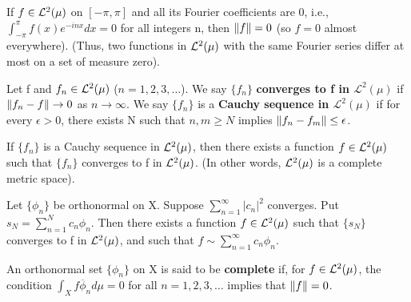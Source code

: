 \begin{corollary}
  \label{cor:chap11:fourier_uniqueness_L2}
  If $f \in \mathcal{L}^{2}(\mu)$ on $[-\pi, \pi]$ and all its Fourier
  coefficients are 0, i.e., $\int_{-\pi}^\pi f(x) e^{-inx} dx = 0$
  for all integers n, then $\left\lVert f \right\rVert = 0$ (so $f=0$ almost everywhere).
  (Thus, two functions in $\mathcal{L}^{2}(\mu)$ with the same Fourier series
  differ at most on a set of measure zero).
\end{corollary}

\begin{definition}
  \label{def:chap11:convergence_cauchy_L2}
  Let f and $f_n \in \mathcal{L}^{2}(\mu)$ ($n=1, 2, 3, \dots$).
  We say $\{ f_n \}$ \textbf{converges to f in $\mathcal{L}^2(\mu)$}
  if $\left\lVert f_n - f \right\rVert \to 0$ as $n \to \infty$.
  We say $\{ f_n \}$ is a \textbf{Cauchy sequence in
  $\mathcal{L}^2(\mu)$} if for every $\epsilon > 0$, there exists N
  such that $n, m \ge N$ implies $\left\lVert f_n - f_m \right\rVert \le \epsilon$.
\end{definition}

\begin{theorem}[Completeness of L2]
  \label{thm:chap11:completeness_L2}
  If $\{ f_n \}$ is a Cauchy sequence in $\mathcal{L}^{2}(\mu)$, then there
  exists a function $f \in \mathcal{L}^{2}(\mu)$ such that $\{ f_n \}$
  converges to f in $\mathcal{L}^{2}(\mu)$.
  (In other words, $\mathcal{L}^{2}(\mu)$ is a complete metric space).
\end{theorem}

\begin{theorem}
  \label{thm:chap11:riesz_fischer}
  Let $\{ \phi_n \}$ be orthonormal on X. Suppose $\sum_{n=1}^\infty
  |c_n|^2$ converges. Put $s_N = \sum_{n=1}^N c_n \phi_n$. Then there
  exists a function $f \in \mathcal{L}^{2}(\mu)$ such that $\{ s_N \}$
  converges to f in $\mathcal{L}^{2}(\mu)$, and such that $f \sim
  \sum_{n=1}^\infty c_n \phi_n$.
\end{theorem}

\begin{definition}
  \label{def:chap11:complete_orthonormal_set}
  An orthonormal set $\{ \phi_n \}$ on X is said to be
  \textbf{complete} if, for $f \in \mathcal{L}^{2}(\mu)$, the condition
  $\int_X f \overline{\phi}_n d\mu = 0$ for all $n=1, 2, 3, \dots$
  implies that $\left\lVert f \right\rVert = 0$.
\end{definition}

